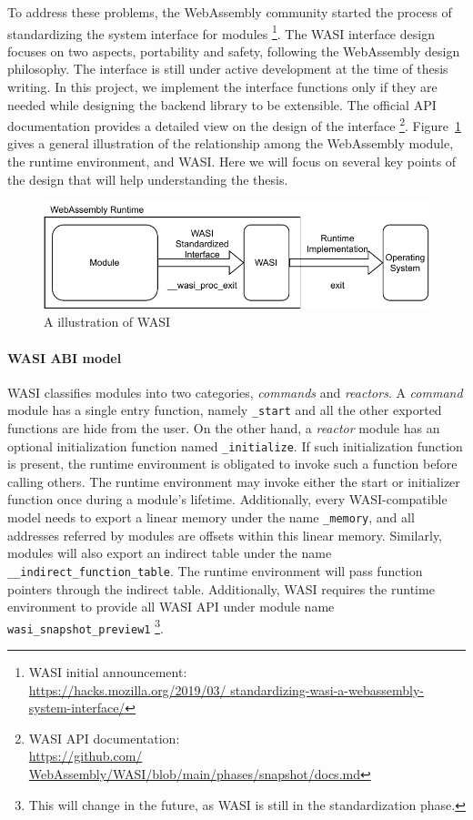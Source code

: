 To address these problems, the WebAssembly community started the process of
standardizing the system interface for modules
\footnote{WASI initial announcement: \\\url{https://hacks.mozilla.org/2019/03/
    standardizing-wasi-a-webassembly-system-interface/}}. The WASI interface
design focuses on two aspects, portability and safety, following the WebAssembly
design philosophy. The interface is still under active development at the time
of thesis writing. In this project, we implement the interface functions only
if they are needed while designing the backend library to be extensible. The
official API documentation provides a detailed view on the design of the
interface \footnote{WASI API documentation: \\\url{https://github.com/
    WebAssembly/WASI/blob/main/phases/snapshot/docs.md}}.
Figure~\ref{fig:wasi-intro} gives a general illustration of the relationship
among the WebAssembly module, the runtime environment, and WASI. Here we will
focus on several key points of the design that will help understanding the
thesis.

\begin{figure}
  \centering
  \includegraphics{Images/wasi-intro.pdf}
  \caption{A illustration of WASI}
  \label{fig:wasi-intro}
\end{figure}

\paragraph{WASI ABI model}
WASI classifies modules into two categories, \emph{commands} and
\emph{reactors}. A \emph{command} module has a single entry function, namely
\texttt{\_start} and all the other exported functions are hide from the user.
On the other hand, a \emph{reactor} module has an optional initialization
function named \texttt{\_initialize}. If such initialization function is
present, the runtime environment is obligated to invoke such a function before
calling others. The runtime environment may invoke either the start or
initializer function once during a module's lifetime. Additionally, every
WASI-compatible model needs to export a linear memory under the name
\texttt{\_memory}, and all addresses referred by modules are offsets within
this linear memory. Similarly, modules will also export an indirect table
under the name \texttt{\_\_indirect\_function\_table}. The runtime environment
will pass function pointers through the indirect table. Additionally, WASI
requires the runtime environment to provide all WASI API under module name
\texttt{wasi\_snapshot\_preview1} \footnote{This will change in the future, as
  WASI is still in the standardization phase.}.

